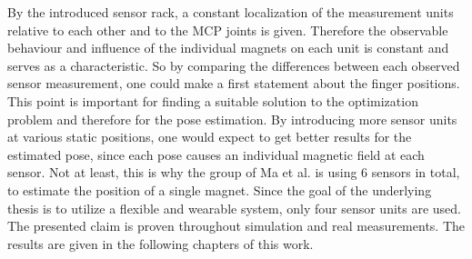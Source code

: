 By the introduced sensor rack, a constant localization of the measurement units relative to each other and to the \ac{MCP} joints is given. Therefore the observable behaviour and influence of the individual magnets on each unit is constant and serves as a characteristic. So by comparing the differences between each observed sensor measurement, one could make a first statement about the finger positions. This point is important for finding a suitable solution to the optimization problem and therefore for the pose estimation. By introducing more sensor units at various static positions, one would expect to get better results for the estimated pose, since each pose causes an individual magnetic field at each sensor. Not at least, this is why the group of Ma et al. is using 6 sensors in total, to estimate the position of a single magnet. Since the goal of the underlying thesis is to utilize a flexible and wearable system, only four sensor units are used. The presented claim is proven throughout simulation and real measurements. The results are given in the following chapters of this work.




